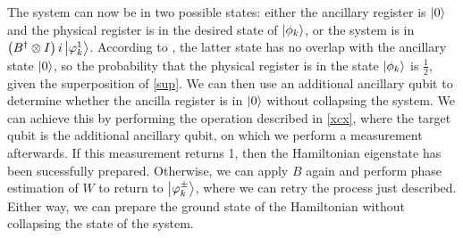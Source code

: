The system can now be in two possible states: either the ancillary register is $\left\vert{0}\right\rangle$ and the physical register is in the desired state of $\left\vert{\phi_k}\right\rangle$, or the system is in $\left( B^{\dagger} \otimes I \right) i \left\vert{\varphi_k^1}\right\rangle$. According to \textcite{steiger}, the latter state has no overlap with the ancillary state $\left\vert{0}\right\rangle$, so the probability that the physical register is in the state $\left\vert{\phi_k}\right\rangle$ is $\frac{1}{2}$, given the superposition of \ref{sup}. We can then use an additional ancillary qubit to determine whether the ancilla register is in $\left\vert{0}\right\rangle$ without collapsing the system. We can achieve this by performing the operation described in \ref{xcx}, where the target qubit is the additional ancillary qubit, on which we perform a measurement afterwards. If this measurement returns 1, then the Hamiltonian eigenstate has been sucessfully prepared. Otherwise, we can apply
$B$ again and perform phase estimation of $W$ to return to $\left\vert{\varphi_k^{\pm}}\right\rangle$, where we can retry the process just described. Either way, we can prepare the ground state of the Hamiltonian without collapsing the state of the system.
